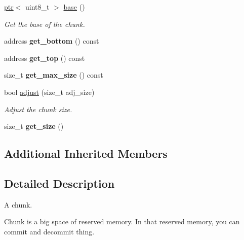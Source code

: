 \begin{DoxyCompactItemize}
\item 
\mbox{\label{classeka2l1_1_1kernel_1_1chunk_a938774ddb1be82d723085b433ef5662c}} 
\mbox{\hyperlink{classeka2l1_1_1ptr}{ptr}}$<$ uint8\+\_\+t $>$ \mbox{\hyperlink{classeka2l1_1_1kernel_1_1chunk_a938774ddb1be82d723085b433ef5662c}{base}} ()
\begin{DoxyCompactList}\small\item\em Get the base of the chunk. \end{DoxyCompactList}\item 
\mbox{\label{classeka2l1_1_1kernel_1_1chunk_afea6e018dd01fee157ef126c3395229a}} 
address {\bfseries get\+\_\+bottom} () const
\item 
\mbox{\label{classeka2l1_1_1kernel_1_1chunk_a6dc9166d346a05a2633674b866b9a9bc}} 
address {\bfseries get\+\_\+top} () const
\item 
\mbox{\label{classeka2l1_1_1kernel_1_1chunk_a8c497d1be5dbcd02832b3eaa18ed5471}} 
size\+\_\+t {\bfseries get\+\_\+max\+\_\+size} () const
\item 
bool \mbox{\hyperlink{classeka2l1_1_1kernel_1_1chunk_a394122db5255ca7c97457eba9f74aa63}{adjust}} (size\+\_\+t adj\+\_\+size)
\begin{DoxyCompactList}\small\item\em Adjust the chunk size. \end{DoxyCompactList}\item 
\mbox{\label{classeka2l1_1_1kernel_1_1chunk_a8ee4032e489414ebbaa27b278dd2cea7}} 
size\+\_\+t {\bfseries get\+\_\+size} ()
\end{DoxyCompactItemize}
\subsection*{Additional Inherited Members}


\subsection{Detailed Description}
A chunk. 

Chunk is a big space of reserved memory. In that reserved memory, you can commit and decommit thing. 

